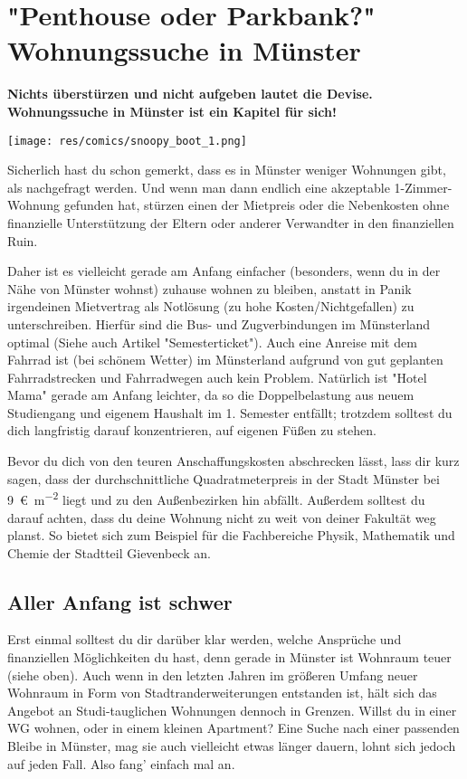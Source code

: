 \section["Penthouse oder Parkbank?" Wohnungssuche in Münster]{"Penthouse oder Parkbank?"\\Wohnungssuche in Münster}
\begin{multicols*}{2}
\textbf{Nichts überstürzen und nicht aufgeben lautet die Devise. Wohnungssuche in Münster ist ein Kapitel für sich!}

\begin{center}
\texttt{[image: res/comics/snoopy\_boot\_1.png]}
\end{center}

Sicherlich hast du schon gemerkt, dass es in Münster weniger Wohnungen gibt, als nachgefragt werden. Und wenn man dann endlich eine akzeptable 1-Zimmer-Wohnung gefunden hat, stürzen einen der Mietpreis oder die Nebenkosten ohne finanzielle Unterstützung der Eltern oder anderer Verwandter in den finanziellen Ruin.

Daher ist es vielleicht gerade am Anfang einfacher (besonders, wenn du in der Nähe von Münster wohnst) zuhause wohnen zu bleiben, anstatt in Panik irgendeinen Mietvertrag als Notlösung (zu hohe Kosten/Nichtgefallen) zu unterschreiben. Hierfür sind die Bus- und Zugverbindungen im Münsterland optimal (Siehe auch Artikel "Semesterticket"). Auch eine Anreise mit dem Fahrrad ist (bei schönem Wetter) im Münsterland aufgrund von gut geplanten Fahrradstrecken und Fahrradwegen auch kein Problem. Natürlich ist "Hotel Mama" gerade am Anfang leichter, da so die Doppelbelastung aus neuem Studiengang und eigenem Haushalt im 1. Semester entfällt; trotzdem solltest du dich langfristig darauf konzentrieren, auf eigenen Füßen zu stehen.

Bevor du dich von den teuren Anschaffungskosten abschrecken lässt, lass dir kurz sagen, dass der durchschnittliche Quadratmeterpreis in der Stadt Münster bei \SI{9}{\euro\per\m\squared} liegt und zu den Außenbezirken hin abfällt. Außerdem solltest du darauf achten, dass du deine Wohnung nicht zu weit von deiner Fakultät weg planst. So bietet sich zum Beispiel für die Fachbereiche Physik, Mathematik und Chemie der Stadtteil Gievenbeck an.

\subsection*{Aller Anfang ist schwer}
Erst einmal solltest du dir darüber klar werden, welche Ansprüche und finanziellen Möglichkeiten du hast, denn gerade in Münster ist Wohnraum teuer (siehe oben). Auch wenn in den letzten Jahren im größeren Umfang neuer Wohnraum in Form von Stadtranderweiterungen entstanden ist, hält sich das Angebot an Studi-tauglichen Wohnungen dennoch in Grenzen. Willst du in einer WG wohnen, oder in einem kleinen Apartment? Eine Suche nach einer passenden Bleibe in Münster, mag sie auch vielleicht etwas länger dauern, lohnt sich jedoch auf jeden Fall. Also fang' einfach mal an.


\end{multicols*}
